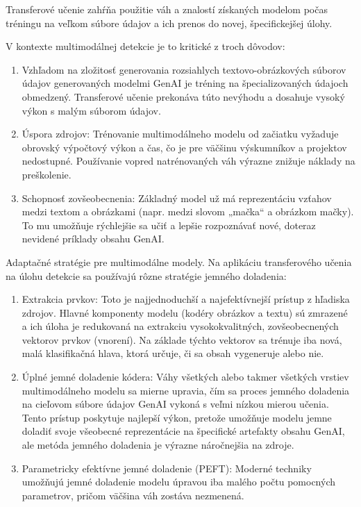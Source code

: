 \documentclass[]{tukediphc}
\begin{document}
Transferové učenie zahŕňa použitie váh a znalostí získaných modelom počas tréningu na veľkom súbore údajov a ich prenos do novej, špecifickejšej úlohy. 

V kontexte multimodálnej detekcie je to kritické z troch dôvodov: 

\begin{enumerate}
    \item Vzhľadom na zložitosť generovania rozsiahlych textovo-obrázkových súborov údajov generovaných modelmi GenAI je tréning na špecializovaných údajoch obmedzený. Transferové učenie prekonáva túto nevýhodu a dosahuje vysoký výkon s malým súborom údajov. 
    \item Úspora zdrojov: Trénovanie multimodálneho modelu od začiatku vyžaduje obrovský výpočtový výkon a čas, čo je pre väčšinu výskumníkov a projektov nedostupné. Používanie vopred natrénovaných váh výrazne znižuje náklady na preškolenie. 
    \item Schopnosť zovšeobecnenia: Základný model už má reprezentáciu vzťahov medzi textom a obrázkami (napr. medzi slovom „mačka“ a obrázkom mačky). To mu umožňuje rýchlejšie sa učiť a lepšie rozpoznávať nové, doteraz nevidené príklady obsahu GenAI.\cite{huggingface:transfer_learning}
\end{enumerate}

Adaptačné stratégie pre multimodálne modely. Na aplikáciu transferového učenia na úlohu detekcie sa používajú rôzne stratégie jemného doladenia: 

\begin{enumerate}
    \item Extrakcia prvkov: Toto je najjednoduchší a najefektívnejší prístup z hľadiska zdrojov. Hlavné komponenty modelu (kodéry obrázkov a textu) sú zmrazené a ich úloha je redukovaná na extrakciu vysokokvalitných, zovšeobecnených vektorov prvkov (vnorení). Na základe týchto vektorov sa trénuje iba nová, malá klasifikačná hlava, ktorá určuje, či sa obsah vygeneruje alebo nie. \cite{huggingface:transfer_learning}
    \item Úplné jemné doladenie kódera: Váhy všetkých alebo takmer všetkých vrstiev multimodálneho modelu sa mierne upravia, čím sa proces jemného doladenia na cieľovom súbore údajov GenAI vykoná s veľmi nízkou mierou učenia. Tento prístup poskytuje najlepší výkon, pretože umožňuje modelu jemne doladiť svoje všeobecné reprezentácie na špecifické artefakty obsahu GenAI, ale metóda jemného doladenia je výrazne náročnejšia na zdroje.
    \item Parametricky efektívne jemné doladenie (PEFT): Moderné techniky umožňujú jemné doladenie modelu úpravou iba malého počtu pomocných parametrov, pričom väčšina váh zostáva nezmenená.
\end{enumerate}
\end{document}
